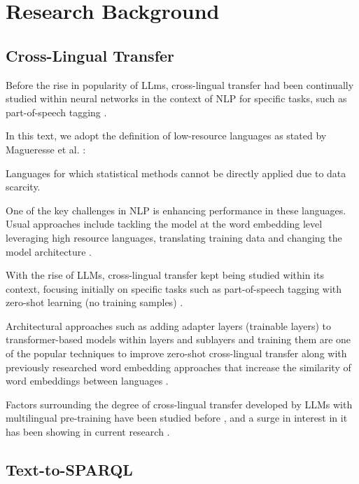 \section{Research Background}\label{section::research_background}

\subsection{Cross-Lingual Transfer}


Before the rise in popularity of LLms, cross-lingual transfer had been continually studied within neural networks in the context of NLP for specific tasks, such as part-of-speech tagging \cite{kim-etal-2017-cross}.

In this text, we adopt the definition of low-resource languages as stated by Magueresse et al. \cite{magueresse2020low}:

\begin{definition}
Languages for which statistical methods cannot be directly applied due to data scarcity.
\end{definition}

One of the key challenges in NLP is enhancing performance in these languages. Usual approaches include tackling the model at the word embedding level leveraging high resource languages, translating training data \cite{schuster2018cross} and changing the model architecture \cite{pfeiffer2020mad}.

With the rise of LLMs, cross-lingual transfer kept being studied within its context, focusing initially on specific tasks such as part-of-speech tagging with zero-shot learning (no training samples) \cite{adelani2024comparing}.

Architectural approaches such as adding adapter layers (trainable layers) to transformer-based models within layers and sublayers and training them are one of the popular techniques to improve zero-shot cross-lingual transfer \cite{pfeiffer2020mad} along with previously researched word embedding approaches that increase the similarity of word embeddings between languages \cite{efimov2023impact}.

Factors surrounding the degree of cross-lingual transfer developed by LLMs with multilingual pre-training have been studied before \cite{fujinuma2022match}, and a surge in interest in it has been showing in current research \cite{wang2024probing}.


\subsection{Text-to-SPARQL}

